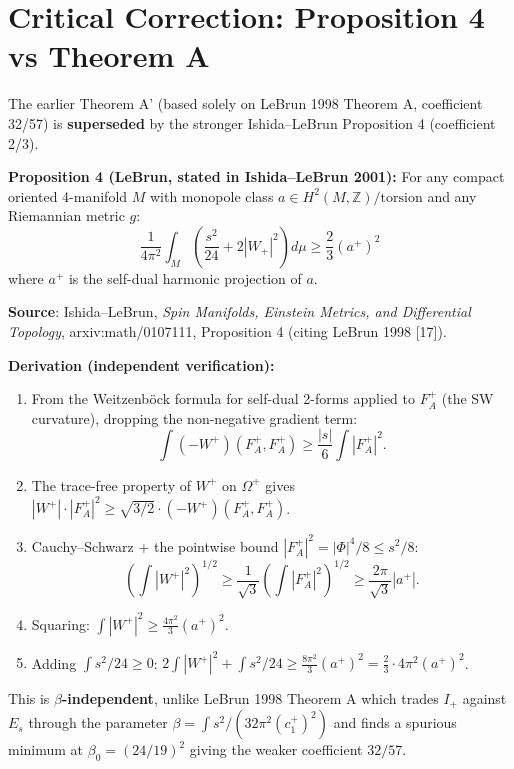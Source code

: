 
\section{Critical Correction: Proposition 4 vs Theorem A}

The earlier Theorem A' (based solely on LeBrun 1998 Theorem A, coefficient 32/57)
is \textbf{superseded} by the stronger Ishida--LeBrun Proposition 4 (coefficient 2/3).

\textbf{Proposition 4 (LeBrun, stated in Ishida--LeBrun 2001):}
For any compact oriented 4-manifold $M$ with monopole class 
$a \in H^2(M, \mathbb{Z})/\mathrm{torsion}$ and any Riemannian metric $g$:
\[
\frac{1}{4\pi^2}\int_M\left(\frac{s^2}{24} + 2|W_+|^2\right)d\mu \geq \frac{2}{3}(a^+)^2
\]
where $a^+$ is the self-dual harmonic projection of $a$.

\textbf{Source}: Ishida--LeBrun, \emph{Spin Manifolds, Einstein Metrics, and Differential 
Topology}, arxiv:math/0107111, Proposition 4 (citing LeBrun 1998 [17]).

\textbf{Derivation (independent verification):}
\begin{enumerate}
\item From the Weitzenb\"ock formula for self-dual 2-forms applied to $F_A^+$
(the SW curvature), dropping the non-negative gradient term:
\[
\int(-W^+)(F_A^+, F_A^+) \geq \frac{|s|}{6}\int|F_A^+|^2.
\]
\item The trace-free property of $W^+$ on $\Omega^+$ gives
$|W^+|\cdot|F_A^+|^2 \geq \sqrt{3/2}\cdot(-W^+)(F_A^+, F_A^+)$.
\item Cauchy--Schwarz + the pointwise bound $|F_A^+|^2 = |\Phi|^4/8 \leq s^2/8$:
\[
\left(\int|W^+|^2\right)^{1/2} \geq \frac{1}{\sqrt{3}}\left(\int|F_A^+|^2\right)^{1/2}
\geq \frac{2\pi}{\sqrt{3}}|a^+|.
\]
\item Squaring: $\int|W^+|^2 \geq \frac{4\pi^2}{3}(a^+)^2$.
\item Adding $\int s^2/24 \geq 0$: 
$2\int|W^+|^2 + \int s^2/24 \geq \frac{8\pi^2}{3}(a^+)^2 = \frac{2}{3}\cdot 4\pi^2(a^+)^2$.
\end{enumerate}

This is \textbf{$\beta$-independent}, unlike LeBrun 1998 Theorem A which trades $I_+$ against 
$E_s$ through the parameter $\beta = \int s^2/(32\pi^2(c_1^+)^2)$ and finds a spurious minimum 
at $\beta_0 = (24/19)^2$ giving the weaker coefficient $32/57$.



